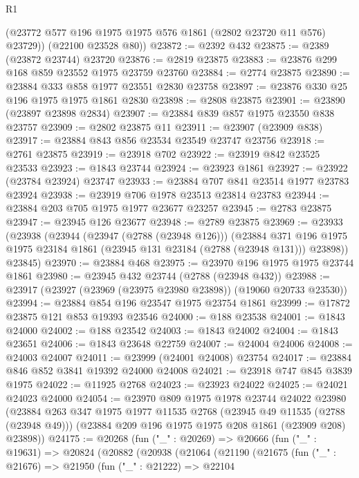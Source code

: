 \begin{lexlean}{R1}
\begin{coremodule}
        (@23772 @577 @196 @1975 @1975 @576 @1861 (@2802 @23720 @11 @576) @23729))
      (@22100 @23528 @80))
@23872 := @2392 @432
@23875 := @2389 (@23872 @23744) @23720
@23876 := @2819 @23875
@23883 := @23876 @299 @168 @859 @23552 @1975 @23759 @23760
@23884 := @2774 @23875
@23890 := @23884 @333 @858 @1977 @23551 @2830 @23758
@23897 := @23876 @330 @25 @196 @1975 @1975 @1861 @2830
@23898 := @2808 @23875
@23901 := @23890 (@23897 @23898 @2834)
@23907 := @23884 @839 @857 @1975 @23550 @838 @23757
@23909 := @2802 @23875 @11
@23911 := @23907 (@23909 @838)
@23917 := @23884 @843 @856 @23534 @23549 @23747 @23756
@23918 := @2761 @23875
@23919 := @23918 @702
@23922 := @23919 @842 @23525 @23533
@23923 := @1843 @23744
@23924 := @23923 @1861
@23927 := @23922 (@23784 @23924) @23747
@23933 := @23884 @707 @841 @23514 @1977 @23783 @23924
@23938 := @23919 @706 @1978 @23513 @23814 @23783
@23944 := @23884 @203 @705 @1975 @1977 @23677 @23257
@23945 := @2783 @23875
@23947 := @23945 @126 @23677
@23948 := @2789 @23875
@23969 := @23933
    (@23938
      (@23944
        (@23947 (@2788 (@23948 @126)))
        (@23884
          @371
          @196
          @1975
          @1975
          @23184
          @1861
          (@23945 @131 @23184 (@2788 (@23948 @131)))
          @23898))
      @23845)
@23970 := @23884 @468
@23975 := @23970 @196 @1975 @1975 @23744 @1861
@23980 := @23945 @432 @23744 (@2788 (@23948 @432))
@23988 := @23917 (@23927 (@23969 (@23975 @23980 @23898)) (@19060 @20733 @23530))
@23994 := @23884 @854 @196 @23547 @1975 @23754 @1861
@23999 := @17872 @23875 @121 @853 @19393 @23546
@24000 := @188 @23538
@24001 := @1843 @24000
@24002 := @188 @23542
@24003 := @1843 @24002
@24004 := @1843 @23651
@24006 := @1843 @23648 @22759
@24007 := @24004 @24006
@24008 := @24003 @24007
@24011 := @23999 (@24001 @24008) @23754
@24017 := @23884 @846 @852 @3841 @19392 @24000 @24008
@24021 := @23918 @747 @845 @3839 @1975
@24022 := @11925 @2768
@24023 := @23923 @24022
@24025 := @24021 @24023 @24000
@24054 := @23970
    @809
    @1975
    @1978
    @23744
    @24022
    @23980
    (@23884
      @263
      @347
      @1975
      @1977
      @11535
      @2768
      (@23945 @49 @11535 (@2788 (@23948 @49)))
      (@23884 @209 @196 @1975 @1975 @208 @1861 (@23909 @208) @23898))
@24175 := @20268
    (fun ("_" : @20269) =>
    @20666
      (fun ("_" : @19631) =>
      @20824
        (@20882
          (@20938
            (@21064
              (@21190
                (@21675
                  (fun ("_" : @21676) =>
                  @21950
                    (fun ("_" : @21222) =>
                    @22104

\end{coremodule}
\end{lexlean}
